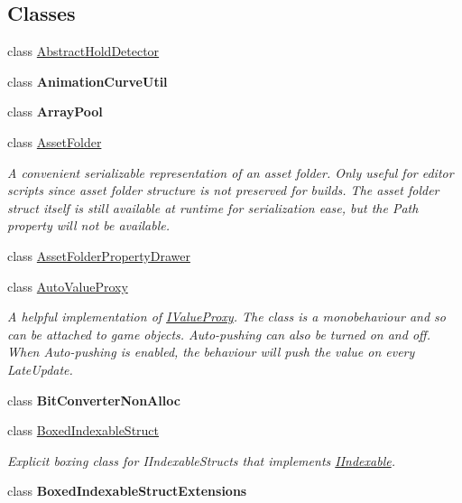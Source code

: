 \subsection*{Classes}
\begin{DoxyCompactItemize}
\item 
class \mbox{\hyperlink{class_leap_1_1_unity_1_1_abstract_hold_detector}{Abstract\+Hold\+Detector}}
\item 
class {\bfseries Animation\+Curve\+Util}
\item 
class {\bfseries Array\+Pool}
\item 
class \mbox{\hyperlink{class_leap_1_1_unity_1_1_asset_folder}{Asset\+Folder}}
\begin{DoxyCompactList}\small\item\em A convenient serializable representation of an asset folder. Only useful for editor scripts since asset folder structure is not preserved for builds. The asset folder struct itself is still available at runtime for serialization ease, but the Path property will not be available. \end{DoxyCompactList}\item 
class \mbox{\hyperlink{class_leap_1_1_unity_1_1_asset_folder_property_drawer}{Asset\+Folder\+Property\+Drawer}}
\item 
class \mbox{\hyperlink{class_leap_1_1_unity_1_1_auto_value_proxy}{Auto\+Value\+Proxy}}
\begin{DoxyCompactList}\small\item\em A helpful implementation of \mbox{\hyperlink{interface_leap_1_1_unity_1_1_i_value_proxy}{I\+Value\+Proxy}}. The class is a monobehaviour and so can be attached to game objects. Auto-\/pushing can also be turned on and off. When Auto-\/pushing is enabled, the behaviour will push the value on every Late\+Update. \end{DoxyCompactList}\item 
class {\bfseries Bit\+Converter\+Non\+Alloc}
\item 
class \mbox{\hyperlink{class_leap_1_1_unity_1_1_boxed_indexable_struct}{Boxed\+Indexable\+Struct}}
\begin{DoxyCompactList}\small\item\em Explicit boxing class for I\+Indexable\+Structs that implements \mbox{\hyperlink{interface_leap_1_1_unity_1_1_i_indexable}{I\+Indexable}}. \end{DoxyCompactList}\item 
class {\bfseries Boxed\+Indexable\+Struct\+Extensions}
\item 

\end{DoxyCompactItemize}
